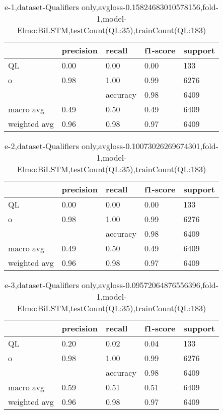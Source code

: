 \begin{table}[!ht] 
\centering
\caption{e-1,dataset-Qualifiers only,avgloss-0.15824683010578156,fold-1,model-Elmo:BiLSTM,testCount(QL:35),trainCount(QL:183)}\label{e-1data-qualS.tsv}
\begin{tabularx}{300pt}{|X|X|X|X|X|}
\hline
&precision&recall&f1-score&support\\
\hline
QL&0.00&0.00&0.00&133\\
\hline
o&0.98&1.00&0.99&6276\\
\hline
&&accuracy&0.98&6409\\
\hline
macro avg&0.49&0.50&0.49&6409\\
\hline
weighted avg&0.96&0.98&0.97&6409\\
\hline
\end{tabularx}
\end{table}
\begin{table}[!ht] 
\centering
\caption{e-2,dataset-Qualifiers only,avgloss-0.10073026269674301,fold-1,model-Elmo:BiLSTM,testCount(QL:35),trainCount(QL:183)}\label{e-2data-qualS.tsv}
\begin{tabularx}{300pt}{|X|X|X|X|X|}
\hline
&precision&recall&f1-score&support\\
\hline
QL&0.00&0.00&0.00&133\\
\hline
o&0.98&1.00&0.99&6276\\
\hline
&&accuracy&0.98&6409\\
\hline
macro avg&0.49&0.50&0.49&6409\\
\hline
weighted avg&0.96&0.98&0.97&6409\\
\hline
\end{tabularx}
\end{table}
\begin{table}[!ht] 
\centering
\caption{e-3,dataset-Qualifiers only,avgloss-0.09572064876556396,fold-1,model-Elmo:BiLSTM,testCount(QL:35),trainCount(QL:183)}\label{e-3data-qualS.tsv}
\begin{tabularx}{300pt}{|X|X|X|X|X|}
\hline
&precision&recall&f1-score&support\\
\hline
QL&0.20&0.02&0.04&133\\
\hline
o&0.98&1.00&0.99&6276\\
\hline
&&accuracy&0.98&6409\\
\hline
macro avg&0.59&0.51&0.51&6409\\
\hline
weighted avg&0.96&0.98&0.97&6409\\
\hline
\end{tabularx}
\end{table}
